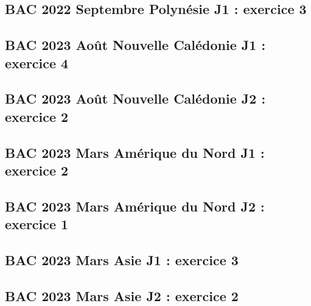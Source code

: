 \documentclass[lang=fr,edition=teacher,layout=sheet]{mxbook}
\begin{document}
\begingroup\endgroup
\par\bigskip
{}\subsection*{BAC 2022 Septembre Polynésie J1 : exercice 3}
\begingroup\endgroup
\par\bigskip
{}\subsection*{BAC 2023 Août Nouvelle Calédonie J1 : exercice 4}
\begingroup\endgroup
\par\bigskip
{}\subsection*{BAC 2023 Août Nouvelle Calédonie J2 : exercice 2}
\begingroup\endgroup
\par\bigskip
{}\subsection*{BAC 2023 Mars Amérique du Nord J1 : exercice 2}
\begingroup\endgroup
\par\bigskip
{}\subsection*{BAC 2023 Mars Amérique du Nord J2 : exercice 1}
\begingroup\endgroup
\par\bigskip
{}\subsection*{BAC 2023 Mars Asie J1 : exercice 3}
\begingroup\endgroup
\par\bigskip
{}\subsection*{BAC 2023 Mars Asie J2 : exercice 2}
\end{document}
